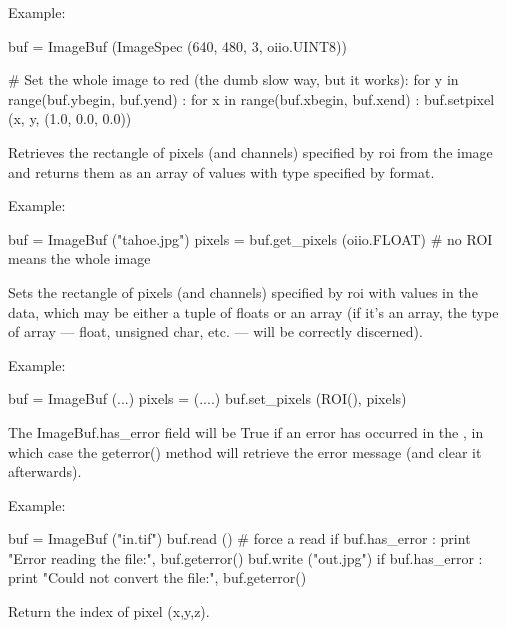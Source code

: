 \noindent Example:
\begin{code}
    buf = ImageBuf (ImageSpec (640, 480, 3, oiio.UINT8))

    # Set the whole image to red (the dumb slow way, but it works):
    for y in range(buf.ybegin, buf.yend) :
        for x in range(buf.xbegin, buf.xend) :
            buf.setpixel (x, y, (1.0, 0.0, 0.0))
\end{code}
\apiend


Retrieves the rectangle of pixels (and channels) specified by {\cf roi} from
the image and returns them as an array of values with type specified by
{\cf format}.

\noindent Example:
\begin{code}
    buf = ImageBuf ("tahoe.jpg")
    pixels = buf.get_pixels (oiio.FLOAT)  # no ROI means the whole image
\end{code}
\apiend


Sets the rectangle of pixels (and channels) specified by {\cf roi} with
values in the {\cf data}, which may be either a tuple of floats or an array
(if it's an array, the type of array --- float, unsigned char, etc. ---
will be correctly discerned).

\noindent Example:
\begin{code}
    buf = ImageBuf (...)
    pixels = (....)
    buf.set_pixels (ROI(), pixels)
\end{code}
\apiend

The {\cf ImageBuf.has_error} field will be {\cf True} if an error has
occurred in the \ImageBuf, in which case the {\cf geterror()} method will
retrieve the error message (and clear it afterwards).

\noindent Example:
\begin{code}
    buf = ImageBuf ("in.tif")
    buf.read ()   # force a read
    if buf.has_error :
        print "Error reading the file:", buf.geterror()
    buf.write ("out.jpg")
    if buf.has_error :
        print "Could not convert the file:", buf.geterror()
\end{code}
\apiend

Return the index of pixel (x,y,z).
\apiend

